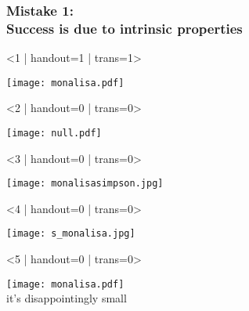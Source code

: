 \begin{frame}
  \frametitle{Mistake 1:\\ Success is due to intrinsic properties}

  \begin{overprint}
    \onslide<1 | handout=1 | trans=1>
    \begin{center}
      \texttt{[image: monalisa.pdf]}%
    \end{center}
    \onslide<2 | handout=0 | trans=0>
    \begin{center}
      \texttt{[image: null.pdf]}%
    \end{center}
    \onslide<3 | handout=0 | trans=0>
    \begin{center}
      \texttt{[image: monalisasimpson.jpg]}
    \end{center}
    \onslide<4 | handout=0 | trans=0>
    \begin{center}
      \texttt{[image: s\_monalisa.jpg]}
    \end{center}
    \onslide<5 | handout=0 | trans=0>
    \begin{center}
      \bigskip
      \texttt{[image: monalisa.pdf]}\\%
      {\tiny it's disappointingly small}
    \end{center}
    \end{overprint}


    \bigskip

  
  
\end{frame}


